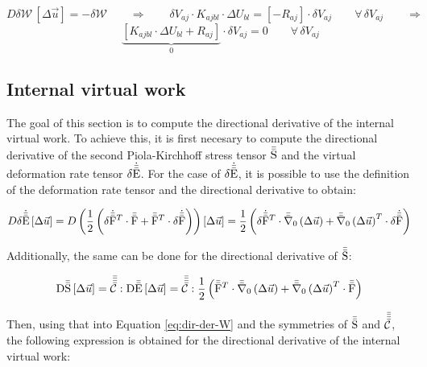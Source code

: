 \begin{equation*}
    D \delta \mathcal{W} \, \left[\Delta \vec{u} \right] = - \delta \mathcal{W} \qquad \Longrightarrow \qquad \delta V_{aj} \cdot K_{ajbl} \cdot \Delta U_{bl} = \left[-R_{aj} \right] \cdot \delta V_{aj} \qquad \forall \, \delta V_{aj} \qquad \Longrightarrow
\end{equation*}
\begin{equation}
    \qquad \underbrace{\left[K_{ajbl} \cdot \Delta U_{bl} + R_{aj} \right]}_{0} \cdot \delta V_{aj} = 0 \qquad \forall \, \delta V_{aj}
\end{equation}

\subsection{Internal virtual work}

The goal of this section is to compute the directional derivative of the internal virtual work. To achieve this, it is first necesary to compute the directional derivative of the second Piola-Kirchhoff stress tensor $\bar{\bar{\mathrm{S}}}$ and the virtual deformation rate tensor $\delta \dot{\bar{\bar{\mathrm{E}}}}$. For the case of $\delta \dot{\bar{\bar{\mathrm{E}}}}$, it is possible to use the definition of the deformation rate tensor and the directional derivative to obtain:

\begin{equation} \label{eq:der-dir-Edot}
    D \delta \dot{\bar{\bar{\mathrm{E}}}} \, [\Delta \vec{u}] = D \left( \frac{1}{2} \left( \delta \dot{\bar{\bar{\mathrm{F}}}}^T \cdot \bar{\bar{\mathrm{F}}} + \bar{\bar{\mathrm{F}}}^{T} \cdot \delta \dot{\bar{\bar{\mathrm{F}}}}  \right) \right) [\Delta \vec{u}] = \frac{1}{2} \left( \delta \dot{\bar{\bar{\mathrm{F}}}}^T \cdot \bar{\bar{\nabla}}_\mathrm{0} \left( \Delta \vec{u} \right) + \bar{\bar{\nabla}}_\mathrm{0} \left( \Delta \vec{u} \right)^{T} \cdot \delta \dot{\bar{\bar{\mathrm{F}}}}  \right)
\end{equation}


Additionally, the same can be done for the directional derivative of $\bar{\bar{\mathrm{S}}}$:

\begin{equation} \label{eq:der-dir-pk2}
    \mathrm{D} \bar{\bar{\mathrm{S}}} \, [\Delta \vec{u}] = \bar{\bar{\bar{\bar{\mathcal{C}}}}} : \mathrm{D} \bar{\bar{\mathrm{E}}} \, [\Delta \vec{u}] = \bar{\bar{\bar{\bar{\mathcal{C}}}}} : \frac{1}{2} \left( \bar{\bar{\mathrm{F}}}^T \cdot \bar{\bar{\nabla}}_\mathrm{0} \left( \Delta \vec{u} \right) + \bar{\bar{\nabla}}_\mathrm{0} \left( \Delta \vec{u} \right)^{T} \cdot \bar{\bar{\mathrm{F}}}  \right)
\end{equation}

Then, using that into Equation \ref{eq:dir-der-W} and the symmetries of $\bar{\bar{\mathrm{S}}}$ and $\bar{\bar{\bar{\bar{\mathcal{C}}}}}$, the following expression is obtained for the directional derivative of the internal virtual work:

